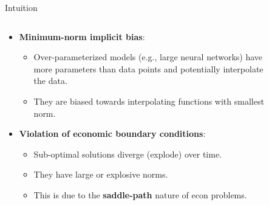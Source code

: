 \documentclass[aspectratio=169,10pt]{beamer}
\newcommand{\emphcolor}[1]{\textbf{\textcolor{emphcolorval}{#1}}}
\begin{document}
\begin{frame}{Intuition}
	\begin{columns}
		\begin{column}{0.5\textwidth}
			\begin{itemize}
				\item \emphcolor{Minimum-norm implicit bias}: 
				\begin{itemize}
					\item Over-parameterized models (e.g., large neural networks) have more parameters than data points and potentially interpolate the data.
					\vspace{0.05in}
					\item They are biased towards interpolating functions with smallest norm. 
				\end{itemize}
				\vspace{0.1in}
				\item \emphcolor{Violation of economic boundary conditions}:
				\begin{itemize}
					\item Sub-optimal solutions diverge (explode) over time.
					\vspace{0.05in}
					\item They have large or explosive norms.
					\vspace{0.05in}
					\item This is due to the \emphcolor{saddle-path} nature of econ problems.
				\end{itemize}
			\end{itemize}
		\end{column}
		\begin{column}{0.5\textwidth}
		\begin{figure}[t!]
			\centering

\end{figure}
\end{column}
\end{columns}
\end{frame}
\end{document}
